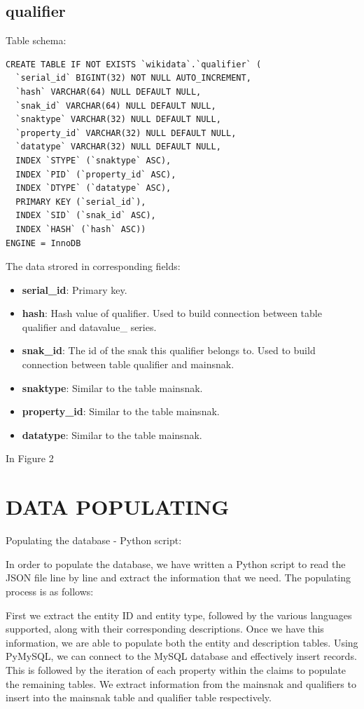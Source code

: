 \documentclass[12pt]{article}
\begin{document}
\subsection{qualifier}
\lstset{language=SQL}
Table schema:
\begin{lstlisting}
CREATE TABLE IF NOT EXISTS `wikidata`.`qualifier` (
  `serial_id` BIGINT(32) NOT NULL AUTO_INCREMENT,
  `hash` VARCHAR(64) NULL DEFAULT NULL,
  `snak_id` VARCHAR(64) NULL DEFAULT NULL,
  `snaktype` VARCHAR(32) NULL DEFAULT NULL,
  `property_id` VARCHAR(32) NULL DEFAULT NULL,
  `datatype` VARCHAR(32) NULL DEFAULT NULL,
  INDEX `STYPE` (`snaktype` ASC),
  INDEX `PID` (`property_id` ASC),
  INDEX `DTYPE` (`datatype` ASC),
  PRIMARY KEY (`serial_id`),
  INDEX `SID` (`snak_id` ASC),
  INDEX `HASH` (`hash` ASC))
ENGINE = InnoDB
\end{lstlisting}
The data strored in corresponding fields:
\begin{itemize}
\item \textbf{serial\_id}: Primary key.
\item \textbf{hash}: Hash value of qualifier. Used to build connection between table qualifier and datavalue\_ series.
\item \textbf{snak\_id}: The id of the snak this qualifier belongs to. Used to build connection between table qualifier and mainsnak.
\item \textbf{snaktype}: Similar to the table mainsnak.
\item \textbf{property\_id}: Similar to the table mainsnak.
\item \textbf{datatype}: Similar to the table mainsnak.
\end{itemize}
In Figure 2
\section{DATA POPULATING}
Populating the database - Python script:

In order to populate the database, we have written a Python script to read the JSON file line by line and extract the information that we need. The populating process is as follows:

First we extract the entity ID and entity type, followed by the various languages supported, along with their corresponding descriptions. Once we have this information, we are able to populate both the entity and description tables. Using PyMySQL, we can connect to the MySQL database and effectively insert records. This is followed by the iteration of each property within the claims to populate the remaining tables. We extract information from the mainsnak and qualifiers to insert into the mainsnak table and qualifier table respectively.
\end{document}
